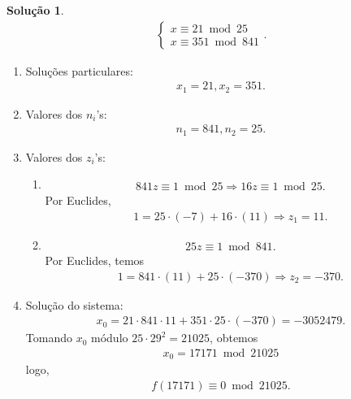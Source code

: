 \documentclass[a4paper,11pt,twoside, leqno]{article}
\theoremstyle{definition}
\newtheorem*{solution}{Solução}
\begin{document}
\begin{solution}
\begin{align*}
\begin{cases}
x\equiv 21\bmod 25 \\
x\equiv 351\bmod 841
\end{cases}.
\end{align*}
\begin{enumerate}
	\item Soluções particulares:
	\begin{align*}
	x_1 = 21, x_2 = 351.
	\end{align*}
	\item Valores dos $n_i$'s:
	\begin{align*}
	n_1 = 841, n_2 = 25.
	\end{align*}
	\item Valores dos $z_i$'s:
	\begin{enumerate}
		\item 
		\begin{align*}
		841z\equiv 1\bmod 25 \Rightarrow 16z\equiv 1\bmod 25.
		\end{align*}
		Por Euclides, 
		\begin{align*}
		1 = 25\cdot(-7) + 16\cdot (11) \Rightarrow z_1 = 11.
		\end{align*}
		\item 
		\begin{align*}
		25z\equiv 1\bmod 841.
		\end{align*}
		Por Euclides, temos
		\begin{align*}
		1 = 841\cdot (11) + 25\cdot(-370) \Rightarrow z_2 = -370.
		\end{align*}
	\end{enumerate}
\item Solução do sistema:
\begin{align*}
x_0 = 21\cdot 841\cdot 11 + 351\cdot 25\cdot (-370) = -3052479.
\end{align*}
Tomando $x_0$ módulo $25\cdot 29^2 = 21025$, obtemos
\begin{align*}
x_0 = 17171\bmod 21025
\end{align*}
logo,
\begin{align*}
f(17171) \equiv 0\bmod 21025.
\end{align*}
\end{enumerate}
\end{solution}
\end{document}
